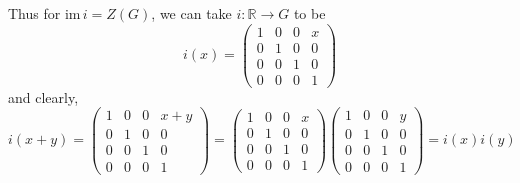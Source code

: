 \documentclass[12pt]{article}
\newcommand{\R}{\mathbb{R}}
\newcommand{\im}{\text{im}\,}
\begin{document}
        Thus for $\im i = Z(G)$, we can take $i: \R \to G$ to be
        \[i(x) = \begin{pmatrix}
            1 & 0 & 0 & x\\
            0 & 1 & 0 & 0\\
            0 & 0 & 1 & 0\\
            0 & 0 & 0 & 1
        \end{pmatrix}\]
        and clearly, 
        \[i(x + y) = \begin{pmatrix}
            1 & 0 & 0 & x + y\\
            0 & 1 & 0 & 0\\
            0 & 0 & 1 & 0\\
            0 & 0 & 0 & 1
        \end{pmatrix} = \begin{pmatrix}
            1 & 0 & 0 & x\\
            0 & 1 & 0 & 0\\
            0 & 0 & 1 & 0\\
            0 & 0 & 0 & 1
        \end{pmatrix}\begin{pmatrix}
            1 & 0 & 0 & y\\
            0 & 1 & 0 & 0\\
            0 & 0 & 1 & 0\\
            0 & 0 & 0 & 1
        \end{pmatrix} = i(x)i(y)\]
\end{document}
